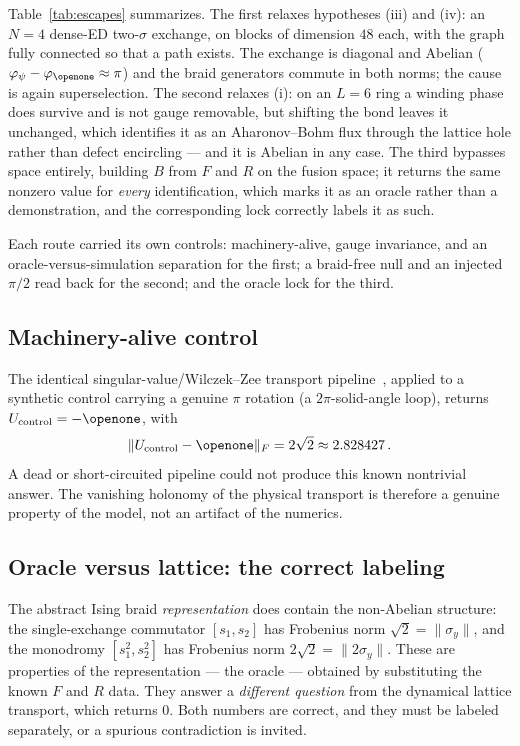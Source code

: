 \documentclass[aps,pra,twocolumn,superscriptaddress,longbibliography,floatfix,nofootinbib]{revtex4-2}
\newcommand{\Id}{\openone}
\newcommand{\Fnorm}[1]{\lVert #1 \rVert_{F}}
\begin{document}
Table~\ref{tab:escapes} summarizes. The first relaxes hypotheses (iii) and
(iv): an $N=4$ dense-ED two-$\sigma$ exchange, on blocks of dimension $48$
each, with the graph fully connected so that a path exists. The exchange is
diagonal and Abelian ($\varphi_\psi-\varphi_{\Id}\approx\pi$) and the braid
generators commute in both norms; the cause is again superselection. The second
relaxes (i): on an $L=6$ ring a winding phase does survive and is not gauge
removable, but shifting the bond leaves it unchanged, which identifies it as an
Aharonov--Bohm flux through the lattice hole rather than defect encircling ---
and it is Abelian in any case. The third bypasses space entirely, building $B$
from $F$ and $R$ on the fusion space; it returns the same nonzero value for
\emph{every} identification, which marks it as an oracle rather than a
demonstration, and the corresponding lock correctly labels it as such.

Each route carried its own controls: machinery-alive, gauge invariance, and an
oracle-versus-simulation separation for the first; a braid-free null and an
injected $\pi/2$ read back for the second; and the oracle lock for the third.

\subsection{Machinery-alive control}
\label{sec:machinery}

The identical singular-value/Wilczek--Zee transport
pipeline~\cite{WilczekZee1984}, applied to a synthetic control carrying a
genuine $\pi$ rotation (a $2\pi$-solid-angle loop), returns
$U_{\mathrm{control}}=-\Id$, with
\begin{equation}
  \Fnorm{U_{\mathrm{control}}-\Id} = 2\sqrt2 \approx 2.828427\,.
  \label{eq:alive}
\end{equation}
A dead or short-circuited pipeline could not produce this known nontrivial
answer. The vanishing holonomy of the physical transport is therefore a genuine
property of the model, not an artifact of the numerics.

\subsection{Oracle versus lattice: the correct labeling}
\label{sec:oracle}

The abstract Ising braid \emph{representation} does contain the non-Abelian
structure: the single-exchange commutator $[s_1,s_2]$ has Frobenius norm
$\sqrt2=\lVert\sigma_y\rVert$, and the monodromy $[s_1^{2},s_2^{2}]$ has
Frobenius norm $2\sqrt2=\lVert2\sigma_y\rVert$. These are properties of the
representation --- the oracle --- obtained by substituting the known $F$ and
$R$ data. They answer a \emph{different question} from the dynamical lattice
transport, which returns $0$. Both numbers are correct, and they must be
labeled separately, or a spurious contradiction is invited.
\end{document}
